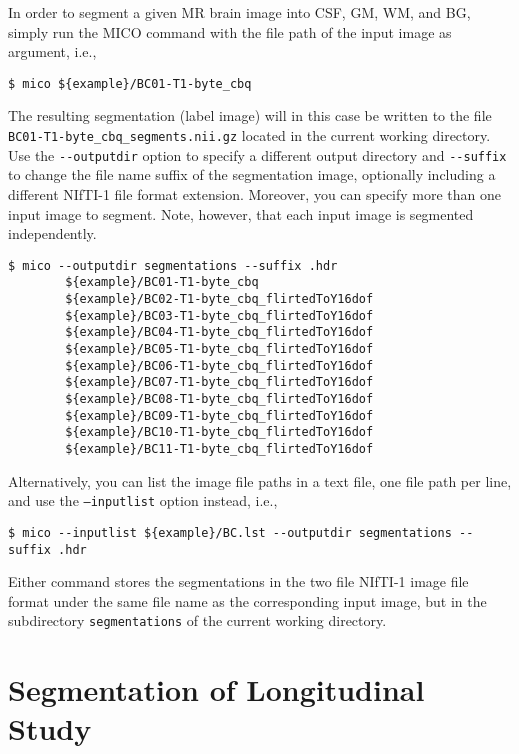 \documentclass[a4paper,12pt]{article}
\begin{document}
In order to segment a given MR brain image into CSF, GM, WM, and BG, simply
run the MICO command with the file path of the input image as argument, i.e.,
\footnotesize
\begin{verbatim}
$ mico ${example}/BC01-T1-byte_cbq
\end{verbatim}
\normalsize
The resulting segmentation (label image) will in this case be written to the
file \linebreak \texttt{BC01-T1-byte{\_}cbq{\_}segments.nii.gz} located in the
current working directory.
Use the \texttt{-{-}outputdir} option to specify a different output directory
and \texttt{-{-}suffix} to change the file name suffix of the
segmentation image, optionally including a different NIfTI-1 file format
extension. Moreover, you can specify more than one input image to segment.
Note, however, that each input image is segmented independently.
\footnotesize
\begin{verbatim}
$ mico --outputdir segmentations --suffix .hdr
        ${example}/BC01-T1-byte_cbq
        ${example}/BC02-T1-byte_cbq_flirtedToY16dof
        ${example}/BC03-T1-byte_cbq_flirtedToY16dof
        ${example}/BC04-T1-byte_cbq_flirtedToY16dof
        ${example}/BC05-T1-byte_cbq_flirtedToY16dof
        ${example}/BC06-T1-byte_cbq_flirtedToY16dof
        ${example}/BC07-T1-byte_cbq_flirtedToY16dof
        ${example}/BC08-T1-byte_cbq_flirtedToY16dof
        ${example}/BC09-T1-byte_cbq_flirtedToY16dof
        ${example}/BC10-T1-byte_cbq_flirtedToY16dof
        ${example}/BC11-T1-byte_cbq_flirtedToY16dof
\end{verbatim}
\normalsize
Alternatively, you can list the image file paths in a text file, one file path
per line, and use the \texttt{--inputlist} option instead, i.e.,
\footnotesize
\begin{verbatim}
$ mico --inputlist ${example}/BC.lst --outputdir segmentations --suffix .hdr
\end{verbatim}
\normalsize
Either command stores the segmentations in the two file NIfTI-1 image file
format under the same file name as the corresponding input image, but in the
subdirectory \texttt{segmentations} of the current working directory.

\pagebreak

\section{Segmentation of Longitudinal Study}
\label{4d}
\end{document}
